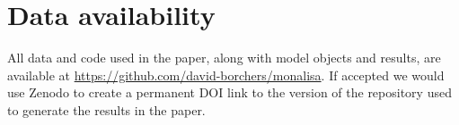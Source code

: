 \documentclass[useAMS,usenatbib,referee]{biom}
\begin{document}
\section*{Data availability}

All data and code used in the paper, along with model objects and results, are available at \url{https://github.com/david-borchers/monalisa}. If accepted we would use Zenodo to create a permanent DOI link to the version of the repository used to generate the results in the paper.




\end{document}
